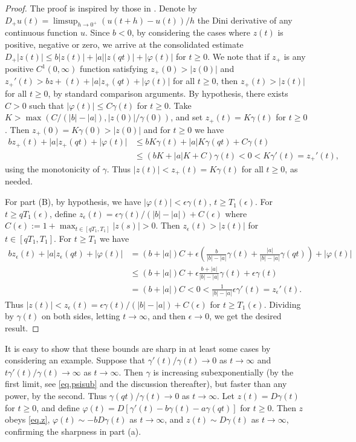\documentclass[a4paper,10pt,reqno]{amsart}
\numberwithin{equation}{section}
\theoremstyle{definition}
\theoremstyle{remark}
\DeclareMathOperator{\1}{\mathbbm 1}
\begin{document}
	\begin{proof} The proof is inspired by those in \cite{AppBuck10,AppBuck2016}. 
		Denote by 
		$D_+ u(t) = \limsup_{h\to 0^+} (u(t+h)-u(t))/h$ 
		the Dini derivative of any continuous function $u$. Since $b<0$, by considering the cases where $z(t)$ is positive, negative or zero, we arrive at the consolidated estimate 
		$D_+|z(t)|\leq b|z(t)|+ |a||z(qt)|+|\varphi(t)|$ for $t\geq 0$.
		We note that if $z_+$ is any positive $C^1(0,\infty)$ function satisfying $z_+(0)>|z(0)|$ and $z_+'(t)> bz+(t)+ |a|z_+(qt)+|\varphi(t)|$ for all $t\geq 0$, then $z_+(t)>|z(t)|$ for all $t\geq 0$, by standard comparison arguments. By hypothesis, there exists $C>0$ such that $|\varphi(t)|\leq C\gamma(t)$ for $t\geq 0$. Take $K>\max\left(C/(|b|-|a|), |z(0)|/\gamma(0)\right)$,
		and set $z_+(t)=K\gamma(t)$ for $t\geq 0$. Then $z_+(0)=K\gamma(0)> |z(0)|$ and for $t\geq 0$ we have 
		\begin{align*}
			bz_+(t)+|a|z_+(qt)+|\varphi(t)|&\leq bK\gamma(t)+|a|K\gamma(qt)+C\gamma(t)\\
			&\leq (bK+|a|K+C)\gamma(t)<0<K\gamma'(t)=z_+'(t),
		\end{align*}
		using the monotonicity of $\gamma$. Thus $|z(t)|< z_+(t)=K\gamma(t)$ for all $t\geq 0$, as needed. 
		
		For part (B), by hypothesis, we have $|\varphi(t)|<\epsilon \gamma(t), \, t\geq T_1(\epsilon)$. For $t\geq qT_1(\epsilon)$, define $z_\epsilon(t)=\epsilon \gamma(t)/(|b|-|a|)+C(\epsilon)$ 
		where $C(\epsilon):=1+\max_{t\in [qT_1,T_1]}|z(s)|>0$. Then $z_\epsilon(t)>|z(t)|$ for $t\in [qT_1,T_1]$. For $t\geq T_1$ we have
		\begin{align*}
			bz_\epsilon(t)+|a|z_\epsilon(qt)+|\varphi(t)|
			&=(b+|a|)C	+ \epsilon\left(\frac{b}{|b|-|a|}\gamma(t)+\frac{|a|}{|b|-|a|}\gamma(qt)\right)+|\varphi(t)|\\
			&\leq (b+|a|)C	+ \epsilon\frac{b+|a|}{|b|-|a|}\gamma(t)+\epsilon \gamma(t)\\
			&= (b+|a|)C<0<\frac{1}{|b|-|a|}\epsilon \gamma'(t)=z_\epsilon'(t).
		\end{align*}
		Thus $|z(t)|<z_\epsilon(t) = \epsilon \gamma(t)/(|b|-|a|)+C(\epsilon)$ for $t\geq T_1(\epsilon)$. Dividing by $\gamma(t)$ on both sides, letting $t\to\infty$, and then $\epsilon\to 0$, we get the desired result. 
	\end{proof}
	It is easy to show that these bounds are sharp in at least some cases by considering an example. Suppose that $\gamma'(t)/\gamma(t)\to 0$ as $t\to\infty$ and $t\gamma'(t)/\gamma(t)\to \infty$ as $t\to\infty$. Then $\gamma$ is increasing subexponentially (by the first limit, see \eqref{eq.psisub} and the discussion thereafter), but faster than any power, by the second. Thus $\gamma(qt)/\gamma(t)\to 0$ as $t\to\infty$. 
	Let $z(t)=D\gamma(t)$ for $t\geq 0$, and define 
	$\varphi(t)=D[\gamma'(t)-b\gamma(t)-a\gamma(qt)]$ for $t\geq 0$. Then $z$ obeys \eqref{eq.z}, $\varphi(t)\sim -bD\gamma(t)$ as $t\to\infty$, and $z(t)\sim D\gamma(t)$ as $t\to\infty$, confirming the sharpness in part (a). 
	
\end{document}
